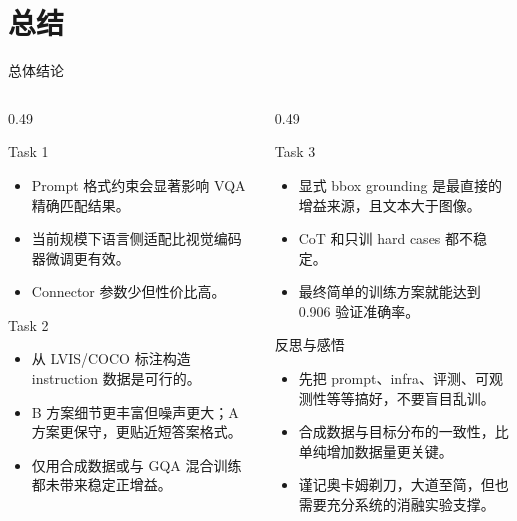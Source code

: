 \documentclass{beamer}
\begin{document}
\section{总结}

\begin{frame}[shrink=4]{总体结论}
\footnotesize
\begin{columns}[T,onlytextwidth]
\begin{column}{0.49\textwidth}
\begin{block}{Task 1}
\begin{itemize}
\item Prompt 格式约束会显著影响 VQA 精确匹配结果。
\item 当前规模下语言侧适配比视觉编码器微调更有效。
\item Connector 参数少但性价比高。
\end{itemize}
\end{block}
\begin{block}{Task 2}
\begin{itemize}
\item 从 LVIS/COCO 标注构造 instruction 数据是可行的。
\item B 方案细节更丰富但噪声更大；A 方案更保守，更贴近短答案格式。
\item 仅用合成数据或与 GQA 混合训练都未带来稳定正增益。
\end{itemize}
\end{block}
\end{column}
\begin{column}{0.49\textwidth}
\begin{block}{Task 3}
\begin{itemize}
\item 显式 bbox grounding 是最直接的增益来源，且文本大于图像。
\item CoT 和只训 hard cases 都不稳定。
\item 最终简单的训练方案就能达到 0.906 验证准确率。
\end{itemize}
\end{block}
\begin{block}{反思与感悟}
\begin{itemize}
\item 先把 prompt、infra、评测、可观测性等等搞好，不要盲目乱训。
\item 合成数据与目标分布的一致性，比单纯增加数据量更关键。
\item 谨记奥卡姆剃刀，大道至简，但也需要充分系统的消融实验支撑。
\end{itemize}
\end{block}
\end{column}
\end{columns}
\end{frame}

\backmatter
\end{document}
